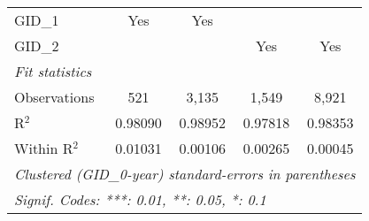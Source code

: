 \begin{tabular}{lcccc}
   GID\_1                                                 & Yes      & Yes                    &                & \\  
   GID\_2                                                 &          &                        & Yes            & Yes\\  
   \midrule
   \emph{Fit statistics}\\
   Observations                                           & 521      & 3,135                  & 1,549          & 8,921\\  
   R$^2$                                                  & 0.98090  & 0.98952                & 0.97818        & 0.98353\\  
   Within R$^2$                                           & 0.01031  & 0.00106                & 0.00265        & 0.00045\\  
   \midrule \midrule
   \multicolumn{5}{l}{\emph{Clustered (GID\_0-year) standard-errors in parentheses}}\\
   \multicolumn{5}{l}{\emph{Signif. Codes: ***: 0.01, **: 0.05, *: 0.1}}\\
\end{tabular}
\par\endgroup


